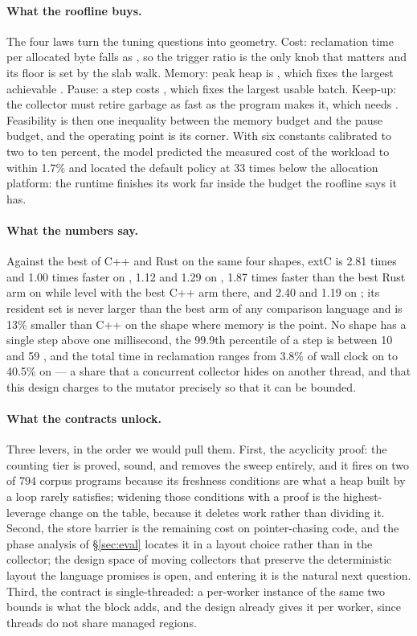 \paragraph{What the roofline buys.}
The four laws turn the tuning questions into geometry.  Cost: reclamation time per allocated byte
falls as , so the trigger ratio is the only knob that matters and
its floor is set by the slab walk.  Memory: peak heap is , which fixes the
largest achievable .  Pause: a step costs , which fixes the
largest usable batch.  Keep-up: the collector must retire garbage as fast as the program makes it,
which needs .  Feasibility is then one inequality between the memory budget and
the pause budget, and the operating point is its corner.  With six constants calibrated to two to
ten percent, the model predicted the measured cost of the  workload to within 1.7\%
and located the default policy at 33 times below the allocation platform: the runtime finishes its
work far inside the budget the roofline says it has.

\paragraph{What the numbers say.}
Against the best of C++ and Rust on the same four shapes, extC is 2.81 times and 1.00 times faster on
, 1.12 and 1.29 on , 1.87 times faster than the best Rust arm on
 while level with the best C++ arm there, and 2.40 and 1.19 on ; its
resident set is never larger than the best arm of any comparison language and is 13\% smaller than C++
on the shape where memory is the point.  No shape has a single step above one millisecond, the 99.9th
percentile of a step is between 10 and 59 \us, and the total time in reclamation ranges from 3.8\% of
wall clock on  to 40.5\% on  --- a share that a concurrent collector hides
on another thread, and that this design charges to the mutator precisely so that it can be bounded.

\paragraph{What the contracts unlock.}
Three levers, in the order we would pull them.  First, the acyclicity proof: the counting tier is
proved, sound, and removes the sweep entirely, and it fires on two of 794 corpus programs because its
freshness conditions are what a heap built by a loop rarely satisfies; widening those conditions with a
proof is the highest-leverage change on the table, because it deletes work rather than dividing it.
Second, the store barrier is the remaining cost on pointer-chasing code, and the phase analysis of
\S\ref{sec:eval} locates it in a layout choice rather than in the collector; the design space of
moving collectors that preserve the deterministic layout the language promises is open, and entering it
is the natural next question.  Third, the contract is single-threaded: a per-worker instance of the
same two bounds is what the  block adds, and the design already gives it per worker,
since threads do not share managed regions.

